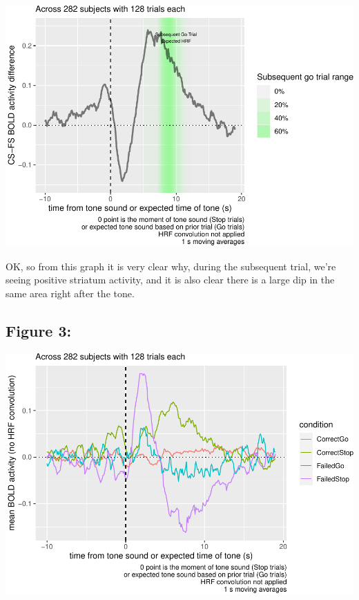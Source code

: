 \documentclass[
]{article}
\newenvironment{Shaded}{\begin{snugshade}}{\end{snugshade}}
\newcommand{\CommentTok}[1]{\textcolor[rgb]{0.56,0.35,0.01}{\textit{#1}}}
\newcommand{\ControlFlowTok}[1]{\textcolor[rgb]{0.13,0.29,0.53}{\textbf{#1}}}
\newcommand{\DataTypeTok}[1]{\textcolor[rgb]{0.13,0.29,0.53}{#1}}
\newcommand{\KeywordTok}[1]{\textcolor[rgb]{0.13,0.29,0.53}{\textbf{#1}}}
\newcommand{\NormalTok}[1]{#1}
\newcommand{\OperatorTok}[1]{\textcolor[rgb]{0.81,0.36,0.00}{\textbf{#1}}}
\newcommand{\StringTok}[1]{\textcolor[rgb]{0.31,0.60,0.02}{#1}}
\begin{document}
\includegraphics{sst_paper_generation_files/figure-latex/unnamed-chunk-26-1.pdf}

OK, so from this graph it is very clear why, during the subsequent
trial, we're seeing positive striatum activity, and it is also clear
there is a large dip in the same area right after the tone.

\hypertarget{figure-3}{%
\subsection{Figure 3:}\label{figure-3}}

\begin{Shaded}
\end{Shaded}

\includegraphics{sst_paper_generation_files/figure-latex/unnamed-chunk-27-1.pdf}
\end{document}
